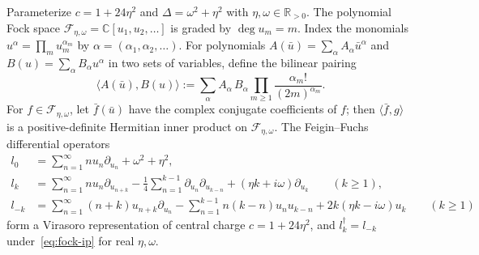\documentclass[twoside,10pt]{article}
\numberwithin{equation}{section}
\theoremstyle{slbody}
\theoremstyle{definition}
\theoremstyle{remark}
\begin{document}
Parameterize \(c=1+24\eta^2\) and \(\Delta=\omega^2+\eta^2\) with
\(\eta,\omega\in\mathbb R_{>0}\).  The polynomial Fock space
\(\mathcal F_{\eta,\omega}=\mathbb C[u_1,u_2,\dots]\) is graded by
\(\deg u_m=m\).  Index the monomials \(u^\alpha=\prod_m u_m^{\alpha_m}\) by
\(\alpha=(\alpha_1,\alpha_2,\dots)\).  For polynomials
\(A(\bar u)=\sum_\alpha A_\alpha\bar u^\alpha\) and
\(B(u)=\sum_\alpha B_\alpha u^\alpha\) in two sets of variables, define the
bilinear pairing
\begin{equation}\label{eq:fock-ip}
 \langle A(\bar u),B(u)\rangle
 :=\sum_{\alpha}A_\alpha\,B_\alpha\prod_{m\geq1}\frac{\alpha_m!}{(2m)^{\alpha_m}}.
\end{equation}
For \(f\in\mathcal F_{\eta,\omega}\), let \(\bar f(\bar u)\) have the complex
conjugate coefficients of \(f\); then \(\langle\bar f,g\rangle\) is a
positive-definite Hermitian inner product on \(\mathcal F_{\eta,\omega}\).
The Feigin--Fuchs differential operators~\cite[\S2.1, (2.2) and (2.5)--(2.6)]{BeskenDattaKraus2019}
\begin{equation}\label{eq:ff-ops}
 \begin{aligned}
  l_0&=\sum_{n=1}^\infty n u_n\partial_{u_n}+\omega^2+\eta^2,\\
  l_k&=\sum_{n=1}^\infty n u_n\partial_{u_{n+k}}
       -\frac14\sum_{n=1}^{k-1}\partial_{u_n}\partial_{u_{k-n}}
       +(\eta k+i\omega)\partial_{u_k}\qquad(k\geq1),\\
  l_{-k}&=\sum_{n=1}^\infty(n+k)u_{n+k}\partial_{u_n}
       -\sum_{n=1}^{k-1}n(k-n)u_nu_{k-n}
       +2k(\eta k-i\omega)u_k\qquad(k\geq1)
 \end{aligned}
\end{equation}
form a Virasoro representation of central charge \(c=1+24\eta^2\), and
\(l_k^\dagger=l_{-k}\) under~\eqref{eq:fock-ip} for real \(\eta,\omega\).
\end{document}
